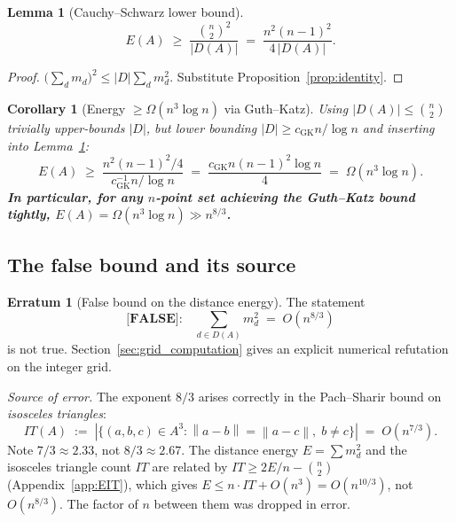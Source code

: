 \documentclass[12pt,a4paper]{amsart}
\theoremstyle{plain}
\newtheorem{lemma}[theorem]{Lemma}
\newtheorem{corollary}[theorem]{Corollary}
\theoremstyle{definition}
\newtheorem{erratum}[theorem]{Erratum}
\newcommand{\abs}[1]{\left\lvert #1 \right\rvert}
\newcommand{\norm}[1]{\left\lVert #1 \right\rVert}
\begin{document}
\begin{lemma}[Cauchy--Schwarz lower bound]
\label{lem:CS_energy}
\[
  E(A) \;\ge\; \frac{\binom{n}{2}^2}{\abs{D(A)}} \;=\;
  \frac{n^2(n-1)^2}{4\,\abs{D(A)}}.
\]
\end{lemma}

\begin{proof}
$\bigl(\sum_d m_d\bigr)^2 \le \abs{D} \sum_d m_d^2$.
Substitute Proposition~\ref{prop:identity}.
\end{proof}

\begin{corollary}[Energy $\ge \Omega(n^3 \log n)$ via Guth--Katz]
\label{cor:E_lower_GK}
Using $\abs{D(A)} \le \binom{n}{2}$ trivially upper-bounds $\abs{D}$,
but \emph{lower bounding} $\abs{D} \ge c_{\mathrm{GK}} n/\log n$ and
inserting into Lemma~\ref{lem:CS_energy}:
\[
  E(A) \;\ge\; \frac{n^2(n-1)^2/4}{c_{\mathrm{GK}}^{-1} n/\log n}
        \;=\; \frac{c_{\mathrm{GK}} n (n-1)^2 \log n}{4}
        \;=\; \Omega(n^3 \log n).
\]
\textbf{In particular, for any $n$-point set achieving the Guth--Katz
bound tightly, $E(A) = \Omega(n^3 \log n) \gg n^{8/3}$.}
\end{corollary}

\subsection{The false bound and its source}

\begin{mdframed}[style=warning]
\begin{erratum}[False bound on the distance energy]
\label{err:false}
The statement
\[
  \textbf{[FALSE]:} \quad \sum_{d \in D(A)} m_d^2 \;=\; O(n^{8/3})
\]
is not true.  Section~\ref{sec:grid_computation} gives an explicit
numerical refutation on the integer grid.

\medskip
\noindent\textit{Source of error.}
The exponent $8/3$ arises correctly in the Pach--Sharir bound on
\emph{isosceles triangles}:
\[
  IT(A) \;:=\; \abs{\{(a,b,c) \in A^3 : \norm{a-b}=\norm{a-c},\; b\ne c\}}
  \;=\; O(n^{7/3}).
\]
Note $7/3 \approx 2.33$, not $8/3 \approx 2.67$.
The distance energy $E = \sum m_d^2$ and the isosceles triangle count
$IT$ are related by $IT \ge 2E/n - \binom{n}{2}$ (Appendix~\ref{app:EIT}),
which gives $E \le n \cdot IT + O(n^3) = O(n^{10/3})$, not $O(n^{8/3})$.
The factor of $n$ between them was dropped in error.
\end{erratum}
\end{mdframed}
\end{document}
